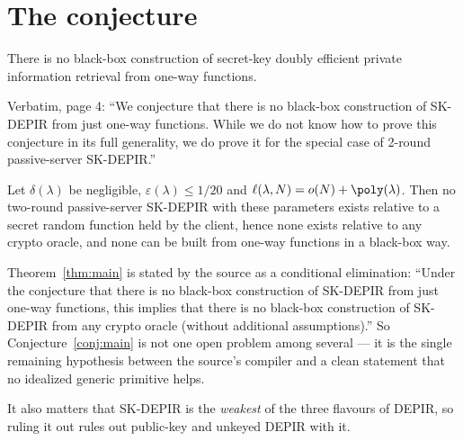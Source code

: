 \documentclass{conjura-conjecture}
\begin{document}
\section{The conjecture}\label{sec:conjectures}

\begin{conjecture}\label{conj:main}
There is no black-box construction of secret-key doubly efficient private
information retrieval from one-way functions.
\end{conjecture}

\begin{remark}\label{rem:framing}
Verbatim, page 4: ``We conjecture that there is no black-box construction
of SK-DEPIR from just one-way functions. While we do not know how to
prove this conjecture in its full generality, we do prove it for the
special case of 2-round passive-server SK-DEPIR.''
\end{remark}

\begin{theorem}\label{thm:special}
Let $\delta(\lambda)$ be negligible, $\varepsilon(\lambda) \le 1/20$ and
$\ell(\lambda,N) = o(N) + \poly(\lambda)$. Then no two-round
passive-server SK-DEPIR with these parameters exists relative to a secret
random function held by the client, hence none exists relative to any
crypto oracle, and none can be built from one-way functions in a
black-box way.
\end{theorem}

\begin{remark}\label{rem:why}
Theorem~\ref{thm:main} is stated by the source as a conditional
elimination: ``Under the conjecture that there is no black-box
construction of SK-DEPIR from just one-way functions, this implies that
there is no black-box construction of SK-DEPIR from any crypto oracle
(without additional assumptions).'' So Conjecture~\ref{conj:main} is not
one open problem among several --- it is the single remaining hypothesis
between the source's compiler and a clean statement that no idealized
generic primitive helps.

It also matters that SK-DEPIR is the \emph{weakest} of the three flavours
of DEPIR, so ruling it out rules out public-key and unkeyed DEPIR with
it.
\end{remark}
\end{document}
